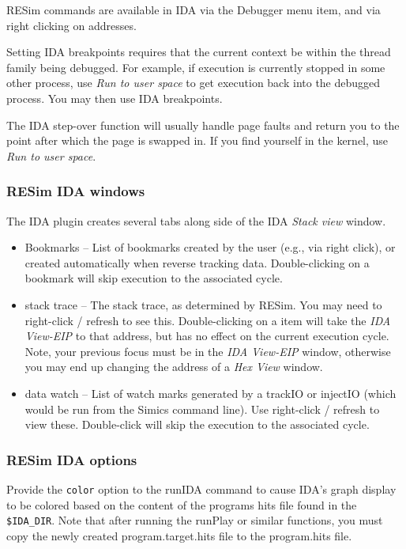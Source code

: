 \documentclass[titlepage]{article}
\begin{document}
RESim commands are available in IDA via the Debugger menu item, and via right clicking on addresses.  

Setting IDA breakpoints requires that the current context be within the thread family being debugged.  For example, if execution is currently 
stopped in some other process, use \textit{Run to user space} to get execution back into the debugged process.  You may then use IDA breakpoints.

The IDA step-over function will usually handle page faults and return you to the point after which the page is swapped in.  If you find yourself in
the kernel, use \textit{Run to user space}.


\subsubsection{RESim IDA windows}
The IDA plugin creates several tabs along side of the IDA \textit{Stack view} window.  
\begin{itemize}
\item Bookmarks -- List of bookmarks created by the user (e.g., via right click), or created automatically when reverse tracking data.
Double-clicking on a bookmark will skip execution to the associated cycle.
\item stack trace -- The stack trace, as determined by RESim.  You may need to right-click / refresh to see this.  Double-clicking on a item
will take the \textit{IDA View-EIP} to that address, but has no effect on the current execution cycle.  Note, your previous focus must be in
the \textit{IDA View-EIP} window, otherwise you may end up changing the address of a \textit{Hex View} window.
\item data watch -- List of watch marks generated by a trackIO or injectIO (which would be run from the Simics command line).  
Use right-click / refresh to view these.  Double-click will skip the execution to the associated cycle.
\end{itemize}

\subsubsection{RESim IDA options}
Provide the {\tt color} option to the runIDA command to cause IDA's graph display to be colored based on the content of the
programs hits file found in the {\tt \$IDA\_DIR}.  Note that after running the runPlay or similar functions, you must copy the
newly created program.target.hits file to the program.hits file.
\end{document}
